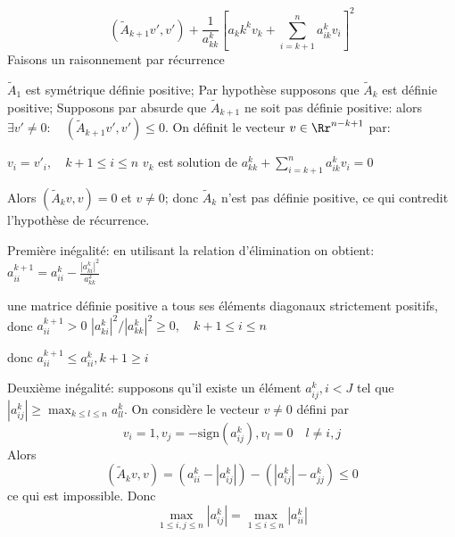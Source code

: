 {\begin{enumerate}
{$$(\tilde{A}_{k+1}v',v') +\frac{1}{a_{kk}^k} [a_kk^kv_k +\sum_{i=k+1}^na_{ik}^kv_i]^2$$
Faisons un raisonnement par r\'ecurrence
\begin{itemize}
$\tilde{A}_1$ est sym\'etrique d\'efinie positive;
Par hypoth\`ese supposons que $\tilde{A}_k$ est d\'efinie positive;
Supposons par absurde que $\tilde{A}_{k+1}$ ne soit pas d\'efinie positive: alors $\exists v'\neq 0:\quad (\tilde{A}_{k+1}v',v')\leq 0$. On d\'efinit le vecteur $v\in\Rr^{n-k+1}$ par:
\begin{itemize}
$v_i=v'_i,\quad k+1\leq i\leq n$
$v_k$ est solution de $a_{kk}^k +\sum_{i=k+1}^n a_{ik}^k v_i=0$
\end{itemize}
Alors $(\tilde{A}_kv,v)=0$ et $v\neq 0$; donc $\tilde{A}_k$ n'est pas d\'efinie positive, ce qui contredit l'hypoth\`ese de r\'ecurrence.
\end{itemize}
Premi\`ere in\'egalit\'e: en utilisant la relation d'\'elimination on obtient: $a_{ii}^{k+1}=a_{ii}^k -\frac{\left|a_{ki}^k\right|^2}{a_{kk}^2}$
\begin{itemize}
une matrice d\'efinie positive a tous ses \'el\'ements diagonaux strictement positifs, donc $a_{ii}^{k+1}>0$
$\left|a_{ki}^k\right|^2/\left|a_{kk}^k\right|^2 \geq 0, \quad k+1\leq i\leq n$
\end{itemize}
donc $a_{ii}^{k+1}\leq a_{ii}^k, k+1\geq i$

Deuxi\`eme in\'egalit\'e: supposons qu'il existe un \'el\'ement $a_{ij}^k, i<J$ tel que $\left|a_{ij}^k\right| \geq \max_{k\leq l \leq n} a_{ll}^k$. On consid\`ere le vecteur $v\neq 0$ d\'efini par
$$v_i=1, v_j=-\mbox{sign} (a_{ij}^k), v_l=0\quad l\neq i,j$$
Alors
$$(\tilde{A}_k v,v) =( a_{ii}^k -\left|a_{ij}^k\right|)-(\left|a_{ij}^k\right| -a_{jj}^k) \leq 0$$
ce qui est impossible. Donc
$$\max_{1\leq i,j\leq n}\left|a_{ij}^{k}\right|=\max_{1\leq i \leq n}\left|a_{ii}^k\right|$$
}
\end{enumerate}
}
